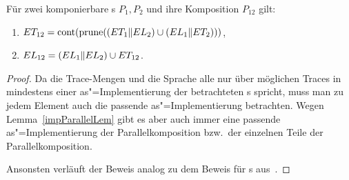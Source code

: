 \begin{Satz}
  Für zwei komponierbare \MEIO{}s $P_1,P_2$ und ihre Komposition $P_{12}$ gilt:
  \begin{enumerate}
    \item $ET _{12} = \mathrm{cont} (\mathrm{prune} ((ET _1\|EL _2) \cup (EL _1\|ET
      _2)))$,
    \item $EL _{12} = (EL _1\|EL _2) \cup ET _{12}$.
  \end{enumerate}
\end{Satz}
\begin{proof}


  Da die Trace-Mengen und die Sprache alle nur über möglichen Traces in
  mindestens einer as"=Implementierung der betrachteten \MEIO{}s spricht, muss
  man zu jedem Element auch die passende as"=Implementierung betrachten. Wegen
  Lemma~\ref{impParallelLem} gibt es aber auch immer eine passende
  as"=Implementierung der Parallelkomposition bzw.\ der einzelnen Teile der
  Parallelkomposition.



  Ansonsten verläuft der Beweis analog zu dem Beweis für
  \EIO{}s aus~\cite{Schinko2016BA}.


\end{proof}
